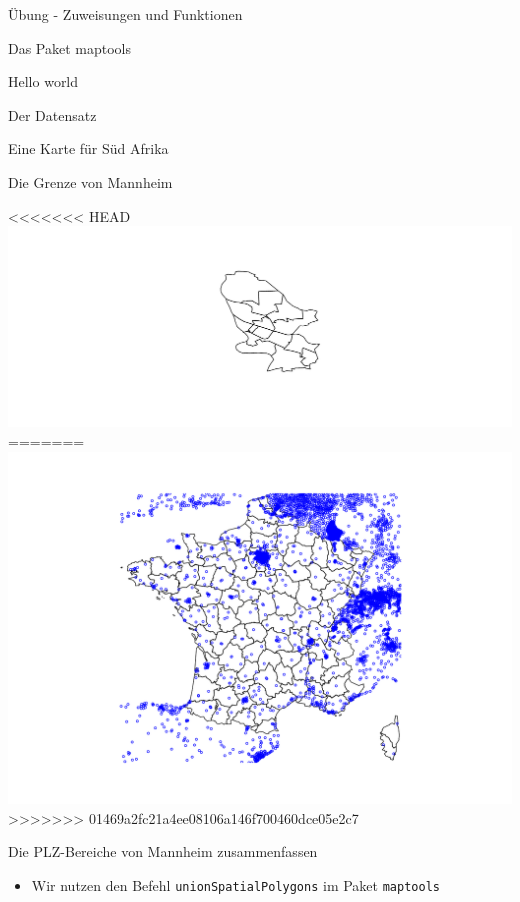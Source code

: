 \documentclass[ignorenonframetext,]{beamer}
\newenvironment{Shaded}{\begin{snugshade}}{\end{snugshade}}
\newcommand{\KeywordTok}[1]{\textcolor[rgb]{0.26,0.66,0.93}{\textbf{#1}}}
\newcommand{\NormalTok}[1]{\textcolor[rgb]{0.74,0.68,0.62}{#1}}
\newcommand{\OperatorTok}[1]{\textcolor[rgb]{0.74,0.68,0.62}{#1}}
\newcommand{\StringTok}[1]{\textcolor[rgb]{0.02,0.61,0.04}{#1}}
\providecommand{\tightlist}{%
  \setlength{\itemsep}{0pt}\setlength{\parskip}{0pt}}
\begin{document}
\begin{frame}[fragile]{Übung - Zuweisungen und Funktionen}
\begin{frame}[fragile]{Das Paket maptools}
\begin{frame}[fragile]{Hello world}
\begin{frame}[fragile]{Der Datensatz}
\begin{frame}[fragile]{Eine Karte für Süd Afrika}
\begin{frame}[fragile]{Die Grenze von Mannheim}
\begin{Shaded}
\end{Shaded}

<<<<<<< HEAD
\includegraphics{Geomedizin_files/figure-beamer/unnamed-chunk-118-1.pdf}
=======
\includegraphics{Geomedizin_files/figure-beamer/unnamed-chunk-139-1.pdf}
>>>>>>> 01469a2fc21a4ee08106a146f700460dce05e2c7

\end{frame}

\begin{frame}[fragile]{Die PLZ-Bereiche von Mannheim zusammenfassen}
\protect\hypertarget{die-plz-bereiche-von-mannheim-zusammenfassen}{}

\begin{itemize}
\tightlist
\item
  Wir nutzen den Befehl \texttt{unionSpatialPolygons} im Paket
  \texttt{maptools}
\end{itemize}


\end{frame}
\end{frame}
\end{frame}
\end{frame}
\end{frame}
\end{frame}
\end{document}
